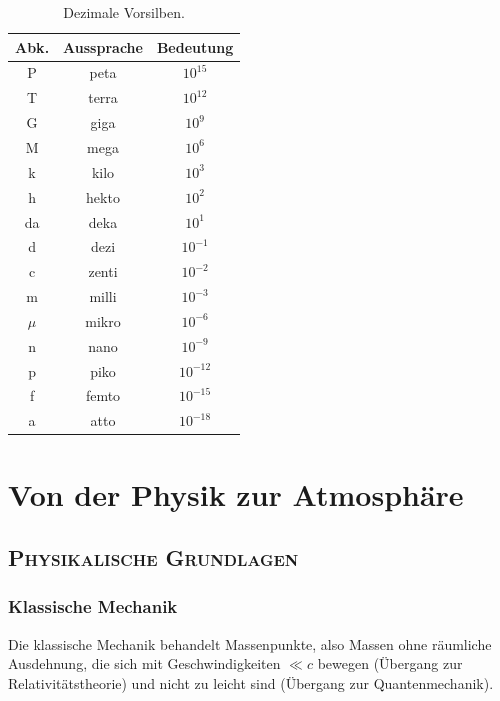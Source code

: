 \documentclass{book}
\begin{document}
\renewcommand{\arraystretch}{1.2}
\begin{table}
\centering
\begin{tabular}{|c|c|c|}
\hline \textbf{Abk}. & \textbf{Aussprache} & \textbf{Bedeutung} \\
\hline\hline P & peta & $10^{15}$ \\
\hline T & terra & $10^{12}$ \\
\hline G & giga & $10^{9}$ \\
\hline M & mega & $10^{6}$ \\
\hline k & kilo & $10^{3}$ \\
\hline h & hekto & $10^{2}$ \\
\hline da & deka & $10^{1}$ \\
\hline d & dezi & $10^{-1}$ \\
\hline c & zenti & $10^{-2}$ \\
\hline m & milli & $10^{-3}$ \\
\hline $\mu$ & mikro & $10^{-6}$ \\
\hline n & nano & $10^{-9}$ \\
\hline p & piko & $10^{-12}$ \\
\hline f & femto & $10^{-15}$ \\
\hline a & atto & $10^{-18}$ \\
\hline
\end{tabular}
\caption{Dezimale Vorsilben.}
\end{table}
\renewcommand{\arraystretch}{1}

\part{Von der Physik zur Atmosphäre}
\label{part:von_der_physik_zur_atmosphaere}

\chapter{\normalfont\textsc{Physikalische Grundlagen}}
\label{chap:physikalische_grundlagen}

\section{Klassische Mechanik}
\label{sec:klassische_mechanik}

Die klassische Mechanik behandelt Massenpunkte, also Massen ohne räumliche Ausdehnung, die sich mit Ge\-schwin\-dig\-kei\-ten $\ll c$ bewegen (Übergang zur Relativitätstheorie) und nicht zu leicht sind (Übergang zur Quantenmechanik).
\end{document}
